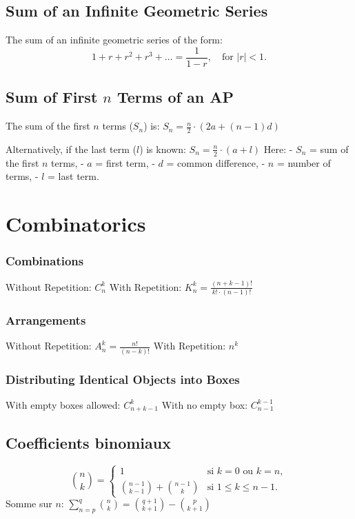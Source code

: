 \subsection{Sum of an Infinite Geometric Series}  
    The sum of an infinite geometric series of the form:  
    \[
    1 + r + r^2 + r^3 + \ldots = \frac{1}{1 - r}, \quad \text{for } |r| < 1.
    \]

\subsection{Sum of First \( n \) Terms of an AP}
    The sum of the first \( n \) terms (\( S_n \)) is:  
    $S_n = \frac{n}{2} \cdot (2a + (n - 1)d)$

    Alternatively, if the last term (\( l \)) is known:  
    $S_n = \frac{n}{2} \cdot (a + l)$
    Here:  
    - \( S_n \) = sum of the first \( n \) terms,  
    - \( a \) = first term,  
    - \( d \) = common difference,  
    - \( n \) = number of terms,  
    - \( l \) = last term.


\section{Combinatorics}

    \subsubsection{Combinations}  
    
    Without Repetition: $C_{n}^{k}$
    With Repetition: $K_{n}^{k} = \frac{(n + k - 1)!}{k! \cdot (n - 1)!}$
    
    \subsubsection{Arrangements}  
    
    Without Repetition: $A_n^k = \frac{n!}{(n - k)!}$
    With Repetition: $n^k$
    
    \subsubsection{Distributing Identical Objects into Boxes}  
    
    With empty boxes allowed: $C_{n+k-1}^k$
    With no empty box: $C_{n-1}^{k-1}$

    \subsection{Coefficients binomiaux}
    \[
    \binom{n}{k} =
    \begin{cases}
    1 & \text{si } k = 0 \text{ ou } k = n, \\
    \binom{n-1}{k-1} + \binom{n-1}{k} & \text{si } 1 \leq k \leq n-1.
    \end{cases}
    \]
    Somme sur $n$: $\sum_{n = p}^q \binom n k = \binom{q + 1}{k + 1} - \binom{p}{k + 1}$ \newline
    
